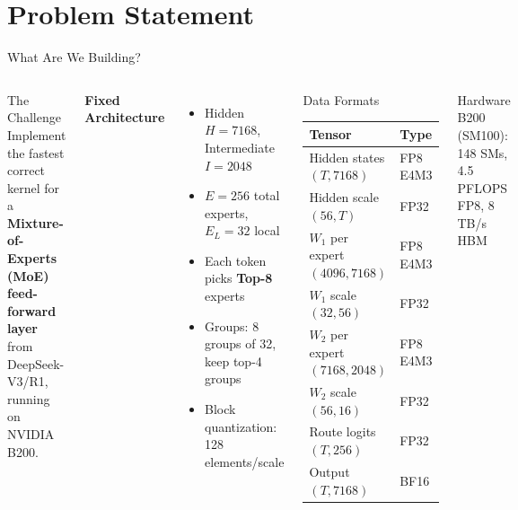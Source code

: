 
\section{Problem Statement}

\begin{frame}{What Are We Building?}
\begin{columns}[T]
\begin{block}{The Challenge}
\small
Implement the fastest correct kernel for a
\textbf{Mixture-of-Experts (MoE) feed-forward layer}
from DeepSeek-V3/R1, running on NVIDIA B200.
\end{block}
\vspace{0.3cm}
\textbf{\small Fixed Architecture}
\begin{itemize}\small
  \item Hidden $H = 7168$, Intermediate $I = 2048$
  \item $E = 256$ total experts, $E_L = 32$ local
  \item Each token picks \textbf{Top-8} experts
  \item Groups: 8 groups of 32, keep top-4 groups
  \item Block quantization: 128 elements/scale
\end{itemize}

\begin{block}{\small Data Formats}
\scriptsize
\begin{tabular}{ll}
\toprule
\textbf{Tensor} & \textbf{Type} \\
\midrule
Hidden states $(T,7168)$ & FP8 E4M3 \\
Hidden scale $(56, T)$ & FP32 \\
$W_1$ per expert $(4096,7168)$ & FP8 E4M3 \\
$W_1$ scale $(32,56)$ & FP32 \\
$W_2$ per expert $(7168,2048)$ & FP8 E4M3 \\
$W_2$ scale $(56,16)$ & FP32 \\
Route logits $(T,256)$ & FP32 \\
Output $(T,7168)$ & BF16 \\
\bottomrule
\end{tabular}
\end{block}

\begin{exampleblock}{\small Hardware}
\scriptsize B200 (SM100): 148 SMs,\\
4.5 PFLOPS FP8, 8 TB/s HBM
\end{exampleblock}
\end{columns}
\end{frame}


